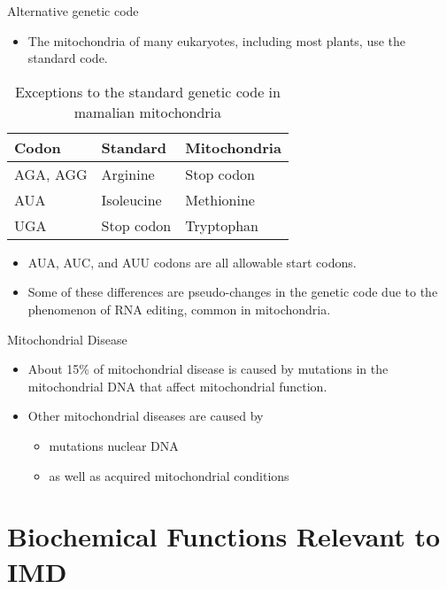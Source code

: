 \documentclass[presentation, smaller]{beamer}
\begin{document}
\begin{frame}[label={sec:orged77633}]{Alternative genetic code}
\begin{itemize}
\item The mitochondria of many eukaryotes, including most plants, use the
standard code.
\end{itemize}

\begin{table}[htbp]
\caption[mito code]{\label{tab:org6b9c857}
Exceptions to the standard genetic code in mamalian mitochondria}
\centering
\begin{tabular}{lll}
Codon & Standard & Mitochondria\\
\hline
AGA, AGG & Arginine & Stop codon\\
AUA & Isoleucine & Methionine\\
UGA & Stop codon & Tryptophan\\
\end{tabular}
\end{table}

\begin{itemize}
\item AUA, AUC, and AUU codons are all allowable start codons.
\item Some of these differences are pseudo-changes in the genetic code due
to the phenomenon of RNA editing, common in mitochondria.
\end{itemize}
\end{frame}


\begin{frame}[label={sec:orgbd3bacc}]{Mitochondrial Disease}
\begin{itemize}
\item About 15\% of mitochondrial disease is caused by mutations in the
mitochondrial DNA that affect mitochondrial function.
\item Other mitochondrial diseases are caused by
\begin{itemize}
\item mutations nuclear DNA
\item as well as acquired mitochondrial conditions
\end{itemize}
\end{itemize}
\end{frame}

\section{Biochemical Functions Relevant to IMD}
\label{sec:orgae7dbfd}
\end{document}

